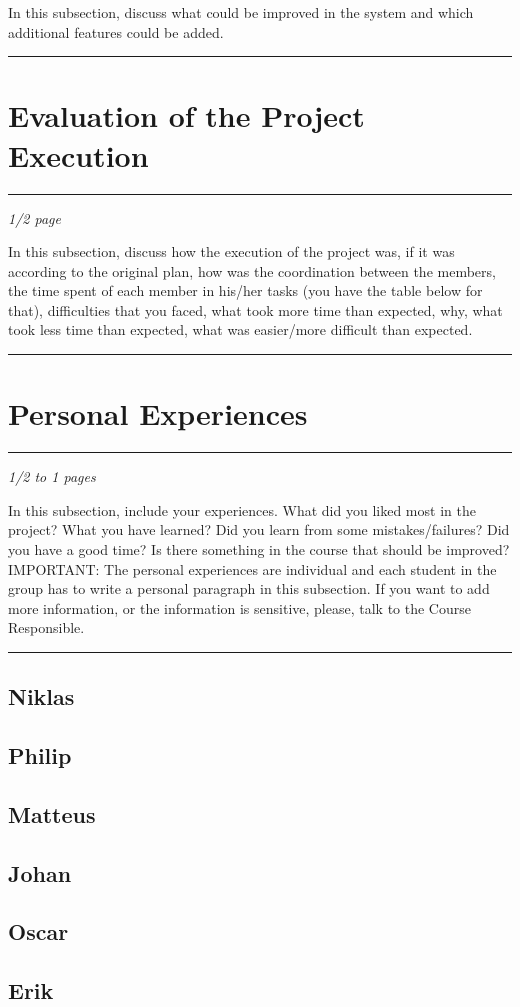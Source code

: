 In this subsection, discuss what could be improved in the system and which additional features could be added. \em
\hrule


\section{Evaluation of the Project Execution}\label{cha:eval}
\hrule
\em 1/2 page

In this subsection, discuss how the execution of the project was, if it was according to the original plan, how was the coordination between the members, the time spent of each member in his/her tasks (you have the table below for that), difficulties that you faced, what took more time than expected, why, what took less time than expected, what was easier/more difficult than expected. \em
\hrule



\section{Personal Experiences}\label{cha:personalexp}
\hrule\em
1/2 to 1 pages

In this subsection, include your experiences. What did you liked most in the project? What you have learned? Did you learn from some mistakes/failures? Did you have a good time? Is there something in the course that should be improved? IMPORTANT: The personal experiences are individual and each student in the group has to write a personal paragraph in this subsection. If you want to add more information, or the information is sensitive, please, talk to the Course Responsible.\em
\hrule

\subsection{Niklas}

\subsection{Philip}

\subsection{Matteus}

\subsection{Johan}

\subsection{Oscar}

\subsection{Erik}



